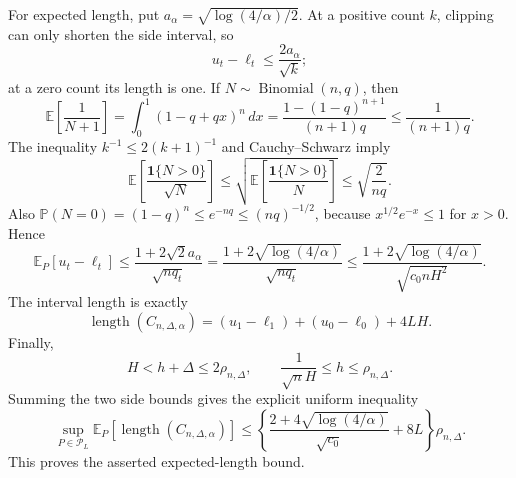 For expected length, put \(a_\alpha=\sqrt{\log(4/\alpha)/2}\).  At a positive count \(k\), clipping can only shorten the side interval, so
\[
 u_t-\ell_t\leq\frac{2a_\alpha}{\sqrt k};
\]
at a zero count its length is one.  If \(N\sim\operatorname{Binomial}(n,q)\), then
\[
 \mathbb E\!\left[\frac1{N+1}\right]
 =\int_0^1(1-q+qx)^n\,dx
 =\frac{1-(1-q)^{n+1}}{(n+1)q}
 \leq\frac1{(n+1)q}.
\]
The inequality \(k^{-1}\leq2(k+1)^{-1}\) and Cauchy--Schwarz imply
\[
 \mathbb E\!\left[\frac{\mathbf1\{N>0\}}{\sqrt N}\right]
 \leq\sqrt{\mathbb E\!\left[\frac{\mathbf1\{N>0\}}N\right]}
 \leq\sqrt{\frac2{nq}}.
\]
Also \(\mathbb P(N=0)=(1-q)^n\leq e^{-nq}\leq(nq)^{-1/2}\), because \(x^{1/2}e^{-x}\leq1\) for \(x>0\).  Hence
\[
 \mathbb E_P[u_t-\ell_t]
 \leq\frac{1+2\sqrt2a_\alpha}{\sqrt{nq_t}}
 =\frac{1+2\sqrt{\log(4/\alpha)}}{\sqrt{nq_t}}
 \leq\frac{1+2\sqrt{\log(4/\alpha)}}{\sqrt{c_0nH^2}}.
\]
The interval length is exactly
\[
 \operatorname{length}(C_{n,\Delta,\alpha})
 =(u_1-\ell_1)+(u_0-\ell_0)+4LH.
\]
Finally,
\[
 H<h+\Delta\leq2\rho_{n,\Delta},
 \qquad
 \frac1{\sqrt nH}\leq h\leq\rho_{n,\Delta}.
\]
Summing the two side bounds gives the explicit uniform inequality
\[
 \sup_{P\in\mathcal P_L}\mathbb E_P[\operatorname{length}(C_{n,\Delta,\alpha})]
 \leq
 \left\{
 \frac{2+4\sqrt{\log(4/\alpha)}}{\sqrt{c_0}}+8L
 \right\}\rho_{n,\Delta}.
\]
This proves the asserted expected-length bound.